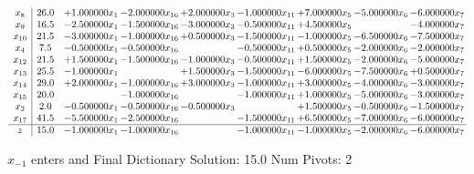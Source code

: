 \documentclass[10pt]{article}
\begin{document}
 \[\begin{array}{c| c c@{\hskip 2pt} c@{\hskip 2pt} c@{\hskip 2pt} c@{\hskip 2pt} c@{\hskip 2pt} c@{\hskip 2pt} c@{\hskip 2pt} }
 x_{8}   &  26.0 & + 1.000000 x_{1} & -2.000000 x_{16} & + 2.000000 x_{3} & -1.000000 x_{11} & + 7.000000 x_{5} & -5.000000 x_{6} & -6.000000 x_{7}\\
 x_{9}   &  16.5 & -2.500000 x_{1} & -1.500000 x_{16} & -3.000000 x_{3} & -0.500000 x_{11} & + 4.500000 x_{5} &   & -4.000000 x_{7}\\
 x_{10}   &  21.5 & -3.000000 x_{1} & -1.000000 x_{16} & + 0.500000 x_{3} & -1.500000 x_{11} & -1.000000 x_{5} & -6.500000 x_{6} & -7.500000 x_{7}\\
 x_{4}   &  7.5 & -0.500000 x_{1} & -0.500000 x_{16} &   & -0.500000 x_{11} & + 0.500000 x_{5} & -2.000000 x_{6} & -2.000000 x_{7}\\
 x_{12}   &  21.5 & + 1.500000 x_{1} & -1.500000 x_{16} & -1.000000 x_{3} & -0.500000 x_{11} & + 1.500000 x_{5} & -2.000000 x_{6} & -5.000000 x_{7}\\
 x_{13}   &  25.5 & -1.000000 x_{1} &   & + 1.500000 x_{3} & -1.500000 x_{11} & -6.000000 x_{5} & -7.500000 x_{6} & + 0.500000 x_{7}\\
 x_{14}   &  29.0 & + 2.000000 x_{1} & -1.000000 x_{16} & + 3.000000 x_{3} & -1.000000 x_{11} & + 3.000000 x_{5} & -4.000000 x_{6} & -3.000000 x_{7}\\
 x_{15}   &  20.0  &   & -1.000000 x_{16} &   & -1.000000 x_{11} & + 1.000000 x_{5} & -5.000000 x_{6} & -3.000000 x_{7}\\
 x_{2}   &  2.0 & -0.500000 x_{1} & -0.500000 x_{16} & -0.500000 x_{3} &   & + 1.500000 x_{5} & -0.500000 x_{6} & -1.500000 x_{7}\\
 x_{17}   &  41.5 & -5.500000 x_{1} & -2.500000 x_{16} &   & -1.500000 x_{11} & + 6.500000 x_{5} & -7.000000 x_{6} & -6.000000 x_{7}\\
\hline
z    &  15.0 & -1.000000 x_{1} & -1.000000 x_{16} &   & -1.000000 x_{11} & -1.000000 x_{5} & -2.000000 x_{6} & -6.000000 x_{7}\\
\end{array}\]


 $ x_{-1} $ enters and Final Dictionary
Solution:  15.0
Num Pivots:  2
\end{document}
